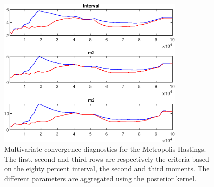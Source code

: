  
\begin{figure}[H]
\centering 
\includegraphics[width=0.8\textwidth]{BRS_growth_KPR_D/Output/BRS_growth_KPR_D_mdiag}
\caption{Multivariate convergence diagnostics for the Metropolis-Hastings.
The first, second and third rows are respectively the criteria based on
the eighty percent interval, the second and third moments. The different 
parameters are aggregated using the posterior kernel.}\label{Fig:MultivariateDiagnostics}
\end{figure}

